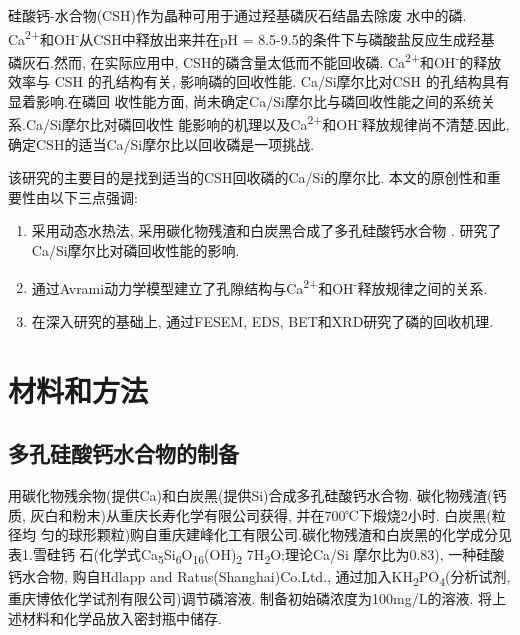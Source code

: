 \documentclass[11pt]{article}
\begin{document}
硅酸钙-水合物(CSH)作为晶种可用于通过羟基磷灰石结晶去除废
水中的磷.\cite{battistoni01_phosp_remov_from_real_anaer} Ca\textsuperscript{2+}和OH\textsuperscript{-}从CSH中释放出来并在pH = 8.5-9.5的条件下与磷酸盐反应生成羟基
磷灰石.然而, 在实际应用中, CSH的磷含量太低而不能回收磷.
\cite{renman10_long_term_phosp_remov_by,de-bashan04_recen_advan_remov_phosp_from}  Ca\textsuperscript{2+}和OH\textsuperscript{-}的释放效率与
CSH \cite{yin11_phosp_remov_from_wastew_by} 的孔结构有关, 影响磷的回收性能.
\cite{westholm06_subst_phosp_remov_poten_benef,baur04_dissol_precip_behav_ettrin_monos}
Ca/Si摩尔比对CSH
\cite{chen04_solub_struc_calcium_silic_hydrat,soyer-uzun11_compos_evolut_calcium_silic_hydrat,richardson04_tober_tober_hydrox_based_model}
的孔结构具有显着影响.在磷回
收性能方面, 尚未确定Ca/Si摩尔比与磷回收性能之间的系统关系.Ca/Si摩尔比对磷回收性
能影响的机理以及Ca\textsuperscript{2+}和OH\textsuperscript{-}释放规律尚不清楚.因此, 确定CSH的适当Ca/Si摩尔比以回收磷是一项挑战.

该研究的主要目的是找到适当的CSH回收磷的Ca/Si的摩尔比. 本文的原创性和重要性由以下三点强调:
\begin{enumerate}
\item 采用动态水热法, 采用碳化物残渣和白炭黑合成了多孔硅酸钙水合物
\cite{li04_format_micro_porous_spher_partic,mansur10_prepar_charac_cytoc_bioac_coatin} . 研究了Ca/Si摩尔比对磷回收性能的影响.
\item 通过Avrami动力学模型建立了孔隙结构与Ca\textsuperscript{2+}和OH\textsuperscript{-}释放规律之间的关系.
\item 在深入研究的基础上, 通过FESEM, EDS, BET和XRD研究了磷的回收机理.
\end{enumerate}

\section{材料和方法}
\label{sec:orgfcc7208}
\subsection{多孔硅酸钙水合物的制备}
\label{sec:org37ec365}
用碳化物残余物(提供Ca)和白炭黑(提供Si)合成多孔硅酸钙水合物. 碳化物残渣(钙
质, 灰白和粉末)从重庆长寿化学有限公司获得, 并在700℃下煅烧2小时. 白炭黑(粒径均
匀的球形颗粒)购自重庆建峰化工有限公司.碳化物残渣和白炭黑的化学成分见表1.雪硅钙
石(化学式Ca\textsubscript{5}Si\textsubscript{6}O\textsubscript{16}(OH)\textsubscript{2} \dot 7H\textsubscript{2}O;理论Ca/Si 摩尔比为0.83), 一种硅酸钙水合物, 购自Hdlapp and Ratus(Shanghai)Co.Ltd., 通过加入KH\textsubscript{2}PO\textsubscript{4}(分析试剂, 重庆博依化学试剂有限公司)调节磷溶液. 制备初始磷浓度为100mg/L的溶液. 将上述材料和化学品放入密封瓶中储存.
\end{document}
